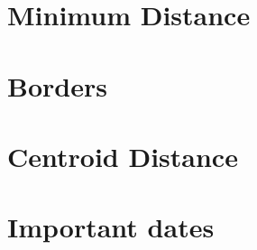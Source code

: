 \documentclass[10pt]{article}
\begin{document}









\clearpage\section{Minimum Distance}









\clearpage\section{Borders}









\clearpage\section{Centroid Distance}











\appendix

\clearpage\section{Important dates}\label{sec:dates}


\end{document}

